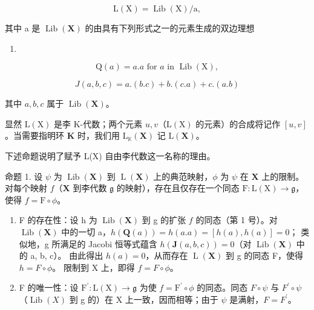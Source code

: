 \[
\mathrm{L} (\mathrm{X}) = \operatorname{Lib} (\mathrm{X}) / \mathrm{a},
\]

其中 a 是 \(\operatorname{Lib}(\mathbf{X})\) 的由具有下列形式之一的元素生成的双边理想

\begin{enumerate}
\def\labelenumi{(\arabic{enumi})}
\tightlist
\item
\end{enumerate}

\[
\mathrm{Q} (a) = a. a \text {   for   } a \text {   in   } \operatorname{Lib} (\mathrm{X}),\tag{2}
\]

\[
J (a, b, c) = a. (b. c) + b. (c. a) + c. (a. b)
\]

其中 \(a, b, c\) 属于 \(\operatorname{Lib}(\mathbf{X})\)。

显然 \(\mathrm{L}(\mathrm{X})\) 是李 K-代数；两个元素 \(u, v\)（\(\mathrm{L}(\mathrm{X})\) 的元素）的合成将记作 \([u, v]\)。当需要指明环 \(\mathbf{K}\) 时，我们用 \(\mathrm{L}_{\mathbb{K}}(\mathbf{X})\) 记 \(\mathrm{L}(\mathbf{X})\)。

下述命题说明了赋予 L(X) 自由李代数这一名称的理由。

命题 1. 设 \(\psi\) 为 \(\operatorname{Lib}(\mathbf{X})\) 到 \(\operatorname{L}(\mathbf{X})\) 上的典范映射，\(\phi\) 为 \(\psi\) 在 \(\mathbf{X}\) 上的限制。对每个映射 \(f\)（\(\mathbf{X}\) 到李代数 \(\mathfrak{g}\) 的映射），存在且仅存在一个同态 \(\mathrm{F}:\mathrm{L}(\mathrm{X})\to \mathfrak{g}\)，使得 \(f = \mathrm{F}\circ \phi\)。

\begin{enumerate}
\def\labelenumi{(\alph{enumi})}
\item
  F 的存在性：设 h 为 \(\operatorname{Lib}(\mathbf{X})\) 到 g 的扩张 \(f\) 的同态（第 1 号）。对 \(\operatorname{Lib}(\mathbf{X})\) 中的一切 a，\(h(\mathbf{Q}(a)) = h(a.a) = [h(a), h(a)] = 0\)； 类似地，g 所满足的 Jacobi 恒等式蕴含 \(h(\mathbf{J}(a, b, c)) = 0\)（对 \(\operatorname{Lib}(\mathbf{X})\) 中的 a, b, c）。 由此得出 \(h(a) = 0\)，从而存在 \(\operatorname{L}(\mathbf{X})\) 到 g 的同态 F，使得 \(h = F \circ \phi\)。 限制到 X 上，即得 \(f = F \circ \phi\)。
\item
  F 的唯一性：设 \(\mathrm{F}^{\prime}:\mathrm{L}(\mathrm{X})\to\mathfrak{g}\) 为使 \(f=\mathrm{F}^{\prime}\circ\phi\) 的同态。同态 \(F\circ\psi\) 与 \(F^{\prime}\circ\psi\)（\(\operatorname{Lib}(X)\) 到 g 的）在 X 上一致，因而相等；由于 \(\psi\) 是满射，\(F=F^{\prime}\)。
\end{enumerate}

